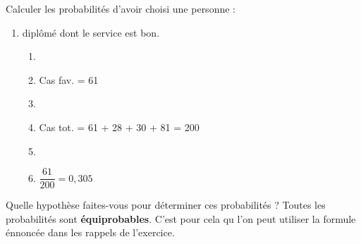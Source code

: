\begin{exo}
\begin{subexo}{Calculer les probabilités d’avoir choisi une personne :}
\begin{enumerate}[parsep=0cm, itemsep=3mm, topsep=3mm]
\begin{enumerate}
				\item[ ]  
				\item[ ] \begin{center}{Cas fav.} = 30 + 81 = 111\end{center} 
				\item[ ]  
				\item[ ] \begin{center}{Cas tot.} = 61 + 28 + 30 + 81 = 200\end{center} 
				\item[ ]  
				\item[ ] \begin{center}$\dfrac{111}{200} = 0,555$\end{center} 
			\end{enumerate}
			\item diplômé dont le service est bon.
			\begin{enumerate}
				\item[ ]  
				\item[ ] \begin{center}{Cas fav.} = 61\end{center} 
				\item[ ]  
				\item[ ] \begin{center}{Cas tot.} = 61 + 28 + 30 + 81 = 200\end{center} 
				\item[ ]  
				\item[ ] \begin{center}$\dfrac{61}{200} = 0,305$\end{center} 
			\end{enumerate}
		\end{enumerate}
		\end{subexo}
		\begin{subexo}{Quelle hypothèse faites-vous pour déterminer ces probabilités ?}
			Toutes les probabilités sont \textbf{équiprobables}. C'est pour cela qu l'on peut utiliser la formule énnoncée dans les rappels de l'exercice.
			
		\end{subexo}
	\end{exo}
